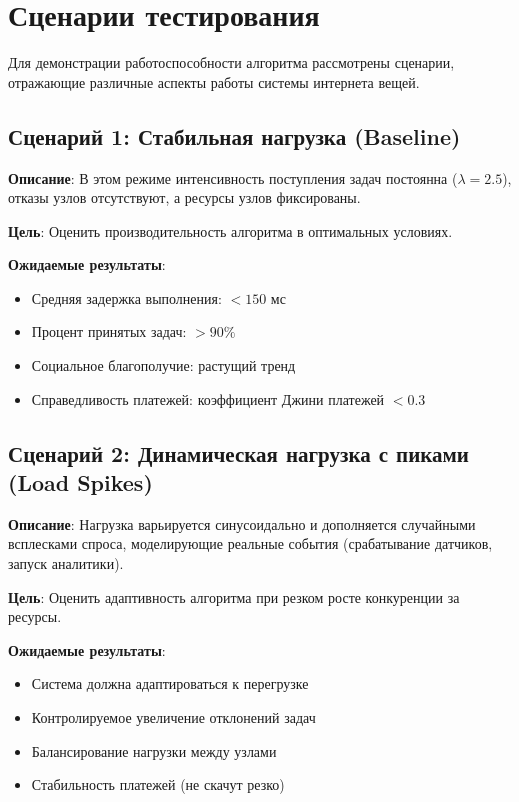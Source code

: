 \section{Сценарии тестирования}

Для демонстрации работоспособности алгоритма рассмотрены сценарии, отражающие различные аспекты работы системы интернета вещей.

\subsection{Сценарий 1: Стабильная нагрузка (Baseline)}

\textbf{Описание}: В этом режиме интенсивность поступления задач постоянна ($\lambda = 2.5$), отказы узлов отсутствуют, а ресурсы узлов фиксированы. 

\textbf{Цель}: Оценить производительность алгоритма в оптимальных условиях.

\textbf{Ожидаемые результаты}:
\begin{itemize}
	\item Средняя задержка выполнения: $< 150$ мс
	\item Процент принятых задач: $> 90\%$
	\item Социальное благополучие: растущий тренд
	\item Справедливость платежей: коэффициент Джини платежей $< 0.3$
\end{itemize}

\subsection{Сценарий 2: Динамическая нагрузка с пиками (Load Spikes)}

\textbf{Описание}: Нагрузка варьируется синусоидально и дополняется случайными всплесками спроса, моделирующие реальные события (срабатывание датчиков, запуск аналитики). 

\textbf{Цель}: Оценить адаптивность алгоритма при резком росте конкуренции за ресурсы.

\textbf{Ожидаемые результаты}:
\begin{itemize}
	\item Система должна адаптироваться к перегрузке
	\item Контролируемое увеличение отклонений задач
	\item Балансирование нагрузки между узлами
	\item Стабильность платежей (не скачут резко)
\end{itemize}

